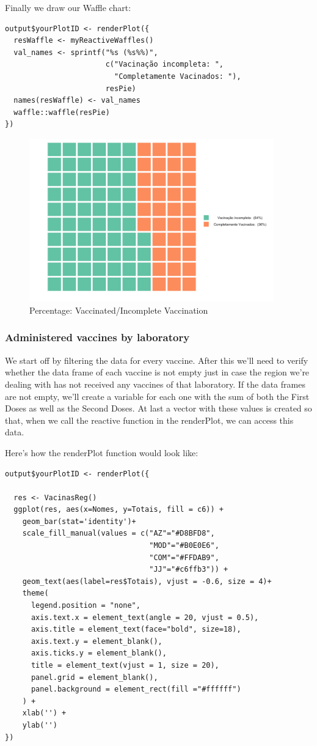 Finally we draw our Waffle chart:
\begin{verbatim}
output$yourPlotID <- renderPlot({
  resWaffle <- myReactiveWaffles()
  val_names <- sprintf("%s (%s%%)", 
                       c("Vacinação incompleta: ", 
                         "Completamente Vacinados: "), 
                       resPie)
  names(resWaffle) <- val_names
  waffle::waffle(resPie)
})
\end{verbatim}

\begin{figure}[H]
\centering
\includegraphics[width=300pt,trim=10 0 0 -10mm]{images/graficomapa2.png}
\caption{Percentage: Vaccinated/Incomplete Vaccination}
\label{fig:diagrama}
\end{figure}

\subsubsection{Administered vaccines by laboratory}

We start off by filtering the data for every vaccine. After this we'll need to verify whether the data frame of each vaccine is not empty just in case the region we're dealing with has not received any vaccines of that laboratory. If the data frames are not empty, we'll create a variable for each one with the sum of both the First Doses as well as the Second Doses. At last a vector with these values is created so that, when we call the reactive function in the renderPlot, we can access this data.

Here's how the renderPlot function would look like:

\begin{verbatim}
output$yourPlotID <- renderPlot({
  
  res <- VacinasReg()
  ggplot(res, aes(x=Nomes, y=Totais, fill = c6)) + 
    geom_bar(stat='identity')+ 
    scale_fill_manual(values = c("AZ"="#D8BFD8",
                                 "MOD"="#B0E0E6",
                                 "COM"="#FFDAB9",
                                 "JJ"="#c6ffb3")) +
    geom_text(aes(label=res$Totais), vjust = -0.6, size = 4)+
    theme(
      legend.position = "none",
      axis.text.x = element_text(angle = 20, vjust = 0.5),
      axis.title = element_text(face="bold", size=18),
      axis.text.y = element_blank(),
      axis.ticks.y = element_blank(),
      title = element_text(vjust = 1, size = 20),
      panel.grid = element_blank(),
      panel.background = element_rect(fill ="#ffffff")
    ) + 
    xlab('') +
    ylab('') 
})
\end{verbatim}

